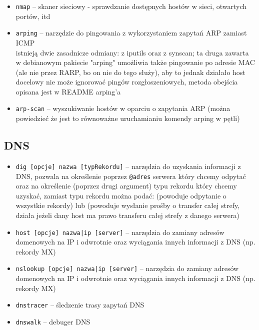 \begin{itemize}
	\item \Verb#nmap# –
		skaner sieciowy - sprawdzanie dostępnych hostów w sieci, otwartych portów, itd
	\item \Verb#arping# –
		narzędzie do pingowania z wykorzystaniem zapytań ARP zamiast ICMP\\
		istnieją dwie zasadnicze odmiany: z iputils oraz z synscan; ta druga zawarta w debianowym pakiecie "arping" umożliwia także pingowanie po adresie MAC (ale nie przez RARP, bo on nie do tego służy), aby to jednak działało host docelowy nie może ignorować pingów rozgłoszeniowych, metoda obejścia opisana jest w README arping'a
	
	\item \Verb#arp-scan# –
		wyszukiwanie hostów w oparciu o zapytania ARP (można powiedzieć że jest to równoważne uruchamianiu komendy arping w pętli)
\end{itemize}

\subsection{DNS}
\begin{itemize}
	\item \Verb#dig [opcje] nazwa [typRekordu]# –
		narzędzia do uzyskania informacji z DNS,
		pozwala na określenie poprzez \Verb#@adres# serwera który chcemy odpytać oraz na określenie (poprzez drugi argument) typu rekordu który chcemy uzyskać,
		zamiast typu rekordu można podać: \Verb@ANY@ (powoduje odpytanie o wszystkie rekordy) lub \Verb@AXFR@ (powoduje wysłanie prośby o transfer całej strefy, działa jeżeli dany host ma prawo transferu całej strefy z danego serwera)
	\item \Verb#host [opcje] nazwa|ip [server]# –
		narzędzia do zamiany adresów domenowych na IP i odwrotnie oraz wyciągania innych informacji z DNS (np. rekordy MX)
	\item \Verb#nslookup [opcje] nazwa|ip [server]# –
		narzędzia do zamiany adresów domenowych na IP i odwrotnie oraz wyciągania innych informacji z DNS (np. rekordy MX)
	
	\item \Verb#dnstracer# –
		śledzenie trasy zapytań DNS
	\item \Verb#dnswalk# –
		debuger DNS
\end{itemize}


